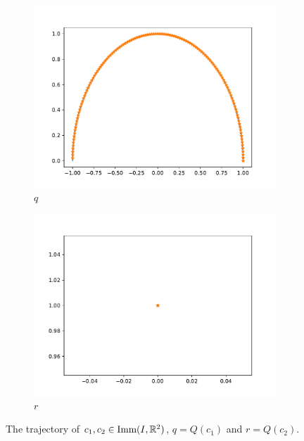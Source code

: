 \begin{figure}[t]
\begin{subfigure}[t]{0.5\textwidth}
        \centering
        \includegraphics[width=\linewidth]{figures/curve_2/curve_q.pdf}
        \caption{\(q\)}
    \end{subfigure}
    \begin{subfigure}[t]{0.5\textwidth}\label{fig:curve_2_r}
        \centering
        \includegraphics[width=\linewidth]{figures/curve_2/curve_r.pdf}
        \caption{\(r\)}
    \end{subfigure}
    \caption{The trajectory of \(c_1, c_2 \in \text{Imm}(I, \mathbb{R}^2)\), \(q = Q(c_1)\) and \(r = Q(c_2)\).}
\end{figure}

